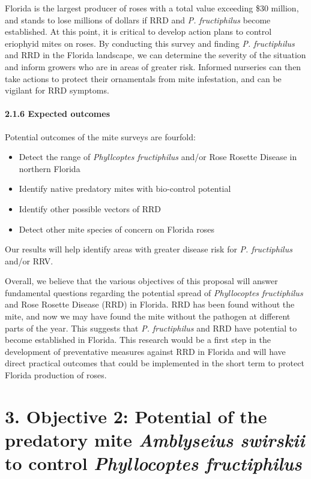 \documentclass[12pt,final,CPage]{ufthesis}
\begin{document}
{  Florida is the largest producer of roses with a total value exceeding \$30 million, and stands to lose millions of dollars if RRD and \emph{P. fructiphilus} become established. At this point, it is critical to develop action plans to control eriophyid mites on roses. By conducting this survey and finding \emph{P. fructiphilus} and RRD in the Florida landscape, we can determine the severity of the situation and inform growers who are in areas of greater risk. Informed nurseries can then take actions to protect their ornamentals from mite infestation, and can be vigilant for RRD symptoms.

  \hypertarget{expected-outcomes}{%
  \subsubsection{2.1.6 Expected outcomes}\label{expected-outcomes}}

  Potential outcomes of the mite surveys are fourfold:
  \begin{itemize}
  \item
    Detect the range of \emph{Phyllcoptes fructiphilus} and/or Rose Rosette Disease in northern Florida
  \item
    Identify native predatory mites with bio-control potential
  \item
    Identify other possible vectors of RRD
  \item
    Detect other mite species of concern on Florida roses
  \end{itemize}
  Our results will help identify areas with greater disease risk for \emph{P. fructiphilus} and/or RRV.

  Overall, we believe that the various objectives of this proposal will answer fundamental questions regarding the potential spread of \emph{Phyllocoptes fructiphilus} and Rose Rosette Disease (RRD) in Florida. RRD has been found without the mite, and now we may have found the mite without the pathogen at different parts of the year. This suggests that \emph{P. fructiphilus} and RRD have potential to become established in Florida. This research would be a first step in the development of preventative measures against RRD in Florida and will have direct practical outcomes that could be implemented in the short term to protect Florida production of roses.

  \hypertarget{swirskii}{%
  \chapter{\texorpdfstring{3. Objective 2: Potential of the predatory mite \emph{Amblyseius swirskii} to control \emph{Phyllocoptes fructiphilus}}{3. Objective 2: Potential of the predatory mite Amblyseius swirskii to control Phyllocoptes fructiphilus}}\label{swirskii}}

}
\end{document}
